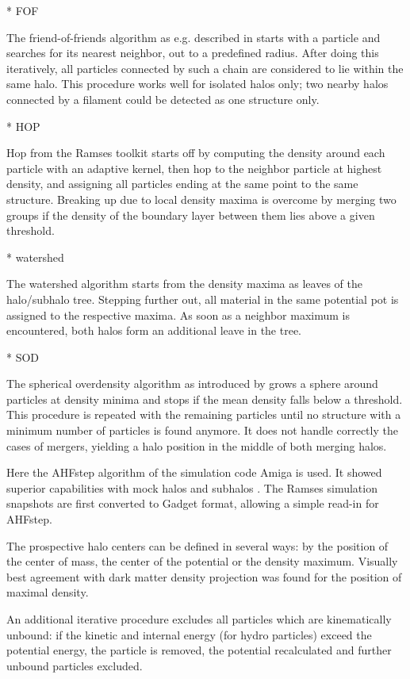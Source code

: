 \documentclass[useAMS,usenatbib]{mn2e}
\begin{document}
* FOF

The friend-of-friends algorithm as e.g. described in \citep{Press1982}
starts with a particle and searches for its nearest neighbor, out to a
predefined radius. After doing this iteratively, all particles
connected by such a chain are considered to lie within the same
halo. This procedure works well for isolated halos only; two nearby
halos connected by a filament could be detected as one structure only.

* HOP

{\sc Hop} from the {\sc Ramses} toolkit starts off by computing the
density around each particle with an adaptive kernel, then hop to the
neighbor particle at highest density, and assigning all particles
ending at the same point to the same structure. Breaking up due to
local density maxima is overcome by merging two groups if the density
of the boundary layer between them lies above a given threshold.

* watershed

The watershed algorithm \citep{TODO} starts from the density maxima as
leaves of the halo/subhalo tree. Stepping further out, all material in
the same potential pot is assigned to the respective maxima. As soon
as a neighbor maximum is encountered, both halos form an additional
leave in the tree.

* SOD

The spherical overdensity algorithm as introduced by \citep{Lacey1994}
grows a sphere around particles at density minima and stops if the
mean density falls below a threshold. This procedure is repeated with
the remaining particles until no structure with a minimum number of
particles is found anymore. It does not handle correctly the cases of
mergers, yielding a halo position in the middle of both merging halos.

Here the {\sc AHFstep} algorithm of the simulation code {\sc Amiga} is
used. It showed superior capabilities with mock halos and subhalos
\citep{TODO}. The {\sc Ramses} simulation snapshots are first
converted to Gadget format, allowing a simple read-in for {\sc
  AHFstep}.

The prospective halo centers can be defined in several ways: by the
position of the center of mass, the center of the potential or the
density maximum. Visually best agreement with dark matter density
projection was found for the position of maximal density.

An additional iterative procedure excludes all particles which are
kinematically unbound: if the kinetic and internal energy (for hydro
particles) exceed the potential energy, the particle is removed, the
potential recalculated and further unbound particles excluded.
\end{document}
